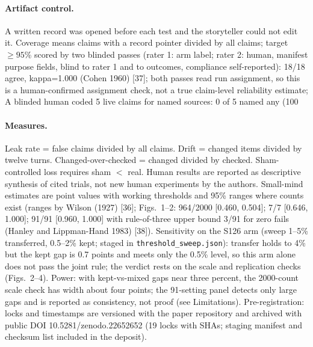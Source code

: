\documentclass[11pt,a4paper]{article}
\begin{document}
\paragraph{Artifact control.} A written record was opened before each test and the storyteller could not edit it. Coverage means claims with a record pointer divided by all claims; target $\ge 95$\% scored by two blinded passes (rater 1: arm label; rater 2: human, manifest purpose fields, blind to rater 1 and to outcomes, compliance self-reported): 18/18 agree, kappa=1.000 (Cohen 1960) [37]; both passes read run assignment, so this is a human-confirmed assignment check, not a true claim-level reliability estimate; A blinded human coded 5 live claims for named sources: 0 of 5 named any (100%
\paragraph{Measures.} Leak rate = false claims divided by all claims. Drift = changed items divided by twelve turns. Changed-over-checked = changed divided by checked. Sham-controlled loss requires sham $<$ real. Human results are reported as descriptive synthesis of cited trials, not new human experiments by the authors. Small-mind estimates are point values with working thresholds and 95\% ranges where counts exist (ranges by Wilson (1927) [36]; Figs.~1--2: 964/2000 [0.460, 0.504]; 7/7 [0.646, 1.000]; 91/91 [0.960, 1.000] with rule-of-three upper bound 3/91 for zero fails (Hanley and Lippman-Hand 1983) [38]). Sensitivity on the S126 arm (sweep 1--5\% transferred, 0.5--2\% kept; staged in \texttt{threshold\_sweep.json}): transfer holds to 4\% but the kept gap is 0.7 points and meets only the 0.5\% level, so this arm alone does not pass the joint rule; the verdict rests on the scale and replication checks (Figs.~2--4). Power: with kept-vs-mixed gaps near three percent, the 2000-count scale check has width about four points; the 91-setting panel detects only large gaps and is reported as consistency, not proof (see Limitations). Pre-registration: locks and timestamps are versioned with the paper repository and archived with public DOI 10.5281/zenodo.22652652 (19 locks with SHAs; staging manifest and checksum list included in the deposit).
\end{document}
